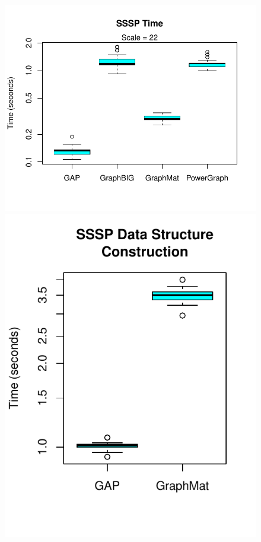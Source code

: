 \documentclass[conference]{IEEEtran}
\begin{document}
\begin{figure}
	\centering
	\begin{minipage}{0.59\linewidth}
		\includegraphics[width=\linewidth, trim=0 36pt 18pt 0, clip]{graphics/sssp_time.pdf}
	\end{minipage}
	\begin{minipage}{0.365\linewidth}
		\includegraphics[width=\linewidth, trim=0 36pt 18pt 0, clip]{graphics/sssp_dsc.pdf}

\end{minipage}
\end{figure}
\end{document}
